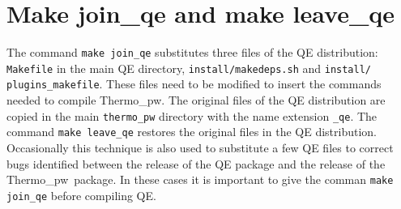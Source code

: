 \documentclass[12pt,a4paper,twoside]{report}
\def\tpw{{\sc Thermo\_pw}}
\begin{document}
\newpage
{\color{dark-blue}\chapter{Make join\_qe and make leave\_qe}}
\color{black}

The command \texttt{make join\_qe} substitutes three files of the QE
distribution: \texttt{Makefile} in the main QE directory, 
\texttt{install/makedeps.sh} and \texttt{install/}
\texttt{plugins\_makefile}.
These files need to be modified to insert the commands needed to
compile \tpw. The original files of the QE distribution are copied
in the main \texttt{thermo\_pw} directory with the name extension
\texttt{\_qe}. The command \texttt{make leave\_qe} restores the original
files in the QE distribution.
Occasionally this technique is also used to substitute a few QE files
to correct bugs identified between the release of the QE package 
and the release of the \tpw\ package. In these cases it is important
to give the comman \texttt{make join\_qe} before compiling QE.
\end{document}
